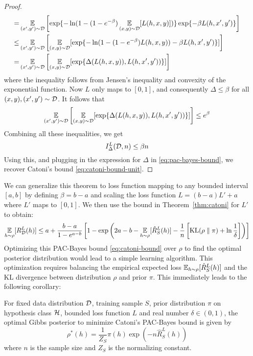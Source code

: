 \begin{proof}
\begin{equation}
\begin{split}
      =& \operatorname*{\mathbb{E}}_{(x', y') \sim \mathcal{D}}\left[\exp\{- \ln(1 - (1 - e^{-\beta}) \operatorname*{\mathbb{E}}_{(x,
      y) \sim \mathcal{D}}[L(h, x, y)])\} \exp\{-\beta L(h, x', y')\}\right] \\
      \leq& \operatorname*{\mathbb{E}}_{(x', y') \sim \mathcal{D}}\left[\operatorname*{\mathbb{E}}_{(x, y) \sim \mathcal{D}}[\exp\{- \ln(1 -
      (1 - e^{-\beta}) L(h, x, y)) - \beta L(h, x', y')\}]\right] \\
      =& \operatorname*{\mathbb{E}}_{(x', y') \sim \mathcal{D}}\left[\operatorname*{\mathbb{E}}_{(x, y) \sim \mathcal{D}}[\exp\{\Delta(L(h, x,
      y)), L(h, x', y'))\}]\right]
    \end{split}
  \end{equation}
  where the inequality follows from Jensen's inequality and convexity of the
  exponential function. Now $L$ only maps to $[0, 1]$, and consequently $\Delta
  \leq \beta$ for all $(x, y), (x', y') \sim \mathcal{D}$. It follows that
  \begin{equation}
      \operatorname*{\mathbb{E}}_{(x', y') \sim \mathcal{D}}\left[\operatorname*{\mathbb{E}}_{(x, y) \sim \mathcal{D}}[\exp\{\Delta(L(h, x,
      y)), L(h, x', y'))\}]\right] \leq e^\beta
  \end{equation}
  Combining all these inequalities, we get
  \begin{equation}
    I_\Delta^L(\mathcal{D}, n) \leq \beta n
  \end{equation}
  Using this, and plugging in the expression for $\Delta$ in
  \eqref{eq:pac-bayes-bound}, we recover Catoni's bound
  \eqref{eq:catoni-bound-unit}.
\end{proof}

We can generalize this theorem to loss function mapping to any bounded interval
$[a, b]$ by defining $\beta = b - a$ and scaling the loss function $L = (b - a)
L' + a$ where $L'$ maps to $[0, 1]$. We then use the bound in
Theorem~\ref{thm:catoni} for $L'$ to obtain:
\begin{equation}
  \label{eq:catoni-bound}
  \operatorname*{\mathbb{E}}_{h \sim \rho}[R_{\mathcal{D}}^L(h)] \leq a + \frac{b - a}{1 - e^{a - b}} \left[1 -
  \exp\left(2 a - b - \operatorname*{\mathbb{E}}_{h \sim \rho}[\hat{R}_S^L(h)] - \frac{1}{n}
  \left[\text{KL}(\rho \parallel \pi) + \ln \frac{1}{\delta}\right]\right)\right]
\end{equation}
Optimizing this PAC-Bayes bound \eqref{eq:catoni-bound} over $\rho$ to find
the optimal posterior distribution would lead to a simple learning algorithm.
This optimization requires balancing the empirical expected loss $\operatorname*{\mathbb{E}}_{h \sim
\rho}[\hat{R}_S^L(h)]$ and the KL divergence between distribution $\rho$ and
prior $\pi$. This immediately leads to the following corollary:

\begin{corollary}
  \label{cor:gibbs}
  For fixed data distribution $\mathcal{D}$, training sample $S$, prior distribution
  $\pi$ on hypothesis class $\mathcal{H}$, bounded loss function $L$ and real number
  $\delta \in (0, 1)$, the optimal Gibbs posterior to minimize Catoni's
  PAC-Bayes bound is given by
  \begin{equation}
    \rho^*(h) = \frac{1}{Z_S} \pi(h) \exp(-n \hat{R}_S^L(h))
  \end{equation}
  where $n$ is the sample size and $Z_S$ is the normalizing constant.
\end{corollary}

